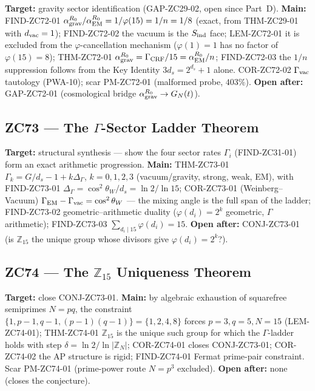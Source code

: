 \documentclass[11pt, a4paper]{article}
\newcommand{\cwsq}{\cos^2\theta_W}
\newcommand{\Ztf}{\mathbb{Z}_{15}}
\newcommand{\Sind}{S_{\rm ind}}
\begin{document}
\begin{zcbox}[title={ZC72: THM-ZC72-01 --- Vacuum/Gravity Sector (Exact at $R_0$)}]
\sloppy
\textbf{Target:} gravity sector identification (GAP-ZC29-02, open since
Part~D). \textbf{Main:} FIND-ZC72-01 $\alpha_{\rm grav}^{R_0}/\alpha_{\rm EM}^{R_0}
= 1/\varphi(15)=1/n=1/8$ (exact, from THM-ZC29-01 with $d_{\rm vac}=1$);
FIND-ZC72-02 the vacuum is the $\Sind$ face; LEM-ZC72-01 it is excluded
from the $\varphi$-cancellation mechanism ($\varphi(1)=1$ has no factor
of $\varphi(15)=8$); THM-ZC72-01 $\alpha_{\rm grav}^{R_0}=\Gamma_{\rm CRF}/15
=\alpha_{\rm EM}^{R_0}/n$; FIND-ZC72-03 the $1/n$ suppression follows from
the Key Identity $3d_s=2^{d_s}{+}1$ alone. COR-ZC72-02 $\Gamma_{\rm vac}$
tautology (PWA-10); scar PM-ZC72-01 (malformed probe, $403\%$).
\textbf{Open after:} GAP-ZC72-01 (cosmological bridge $\alpha_{\rm grav}^{R_0}\to G_N(t)$).
\end{zcbox}

\subsection{ZC73 --- The $\Gamma$-Sector Ladder Theorem}

\begin{zcbox}[title={ZC73: THM-ZC73-01 --- $\Gamma$-Ladder (Exact at $R_0$)}]
\sloppy
\textbf{Target:} structural synthesis --- show the four sector rates
$\Gamma_i$ (FIND-ZC31-01) form an exact arithmetic progression.
\textbf{Main:} THM-ZC73-01 $\Gamma_k = G/d_s - 1 + k\Delta_\Gamma$, $k=0,1,2,3$
(vacuum/gravity, strong, weak, EM), with FIND-ZC73-01
$\Delta_\Gamma=\cwsq/d_s=\ln 2/\ln 15$; COR-ZC73-01 (Weinberg--Vacuum)
$\Gamma_{\rm EM}-\Gamma_{\rm vac}=\cwsq$ --- the mixing angle is the full
span of the ladder; FIND-ZC73-02 geometric--arithmetic duality
($\varphi(d_i)=2^k$ geometric, $\Gamma$ arithmetic); FIND-ZC73-03
$\sum_{d_i\mid 15}\varphi(d_i)=15$. \textbf{Open after:} CONJ-ZC73-01
(is $\Ztf$ the unique group whose divisors give $\varphi(d_i)=2^k$?).
\end{zcbox}

\subsection{ZC74 --- The $\Ztf$ Uniqueness Theorem}

\begin{zcbox}[title={ZC74: THM-ZC74-01 --- $\Ztf$ Uniqueness (Exact)}]
\sloppy
\textbf{Target:} close CONJ-ZC73-01. \textbf{Main:} by algebraic
exhaustion of squarefree semiprimes $N=pq$, the constraint
$\{1, p{-}1, q{-}1, (p{-}1)(q{-}1)\}=\{1,2,4,8\}$ forces $p=3, q=5, N=15$
(LEM-ZC74-01); THM-ZC74-01 $\Ztf$ is the unique such group for which the
$\Gamma$-ladder holds with step $\delta=\ln 2/\ln|\mathbb{Z}_N|$;
COR-ZC74-01 closes CONJ-ZC73-01; COR-ZC74-02 the AP structure is rigid;
FIND-ZC74-01 Fermat prime-pair constraint. Scar PM-ZC74-01 (prime-power
route $N=p^3$ excluded). \textbf{Open after:} none (closes the conjecture).
\end{zcbox}
\end{document}
